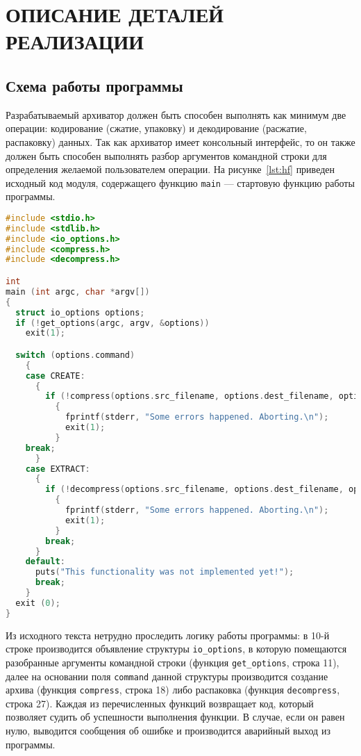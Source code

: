 \section[Описание деталей реализации]{ОПИСАНИЕ ДЕТАЛЕЙ РЕАЛИЗАЦИИ}
\label{sec:realization}

\subsection{Схема работы программы}

Разрабатываемый архиватор должен быть способен выполнять как минимум две
операции: кодирование (сжатие, упаковку) и декодирование (расжатие, распаковку)
данных.
Так как архиватор имеет консольный интерфейс, то он также должен быть способен
выполнять разбор аргументов командной строки для определения желаемой 
пользователем операции.
На рисунке~\ref{lst:hf} приведен исходный код модуля, содержащего функцию 
\texttt{main} --- стартовую функцию работы программы.

\begin{lstlisting}[basicstyle=\scriptsize\ttfamily,
                   numberstyle=\scriptsize\ttfamily,
                   xleftmargin=7mm,
                   language=C,caption=Исходный код функции main,
                   label=lst:hf]
#include <stdio.h>
#include <stdlib.h>
#include <io_options.h>
#include <compress.h>
#include <decompress.h>

int
main (int argc, char *argv[])
{
  struct io_options options;
  if (!get_options(argc, argv, &options))
    exit(1);

  switch (options.command)
    {
    case CREATE:
      {
        if (!compress(options.src_filename, options.dest_filename, options.verbose))
          {
            fprintf(stderr, "Some errors happened. Aborting.\n");
            exit(1);
          }
	break;
      }
    case EXTRACT:
      {
        if (!decompress(options.src_filename, options.dest_filename, options.verbose))
          {
            fprintf(stderr, "Some errors happened. Aborting.\n");
            exit(1);
          }
        break;
      }
    default:
      puts("This functionality was not implemented yet!");
      break;
    }
  exit (0);
}
\end{lstlisting}

Из исходного текста нетрудно проследить логику работы программы:
в 10-й строке производится объявление структуры \texttt{io\_options},
в которую помещаются разобранные аргументы командной строки
(функция \texttt{get\_options}, строка 11),
далее на основании поля \texttt{command} данной структуры производится
создание архива (функция \texttt{compress}, строка 18)
либо распаковка (функция \texttt{decompress}, строка 27).
Каждая из перечисленных функций возвращает код, 
который позволяет судить об успешности выполнения функции.
В случае, если он равен нулю, выводится сообщения об ошибке и 
производится аварийный выход из программы.

